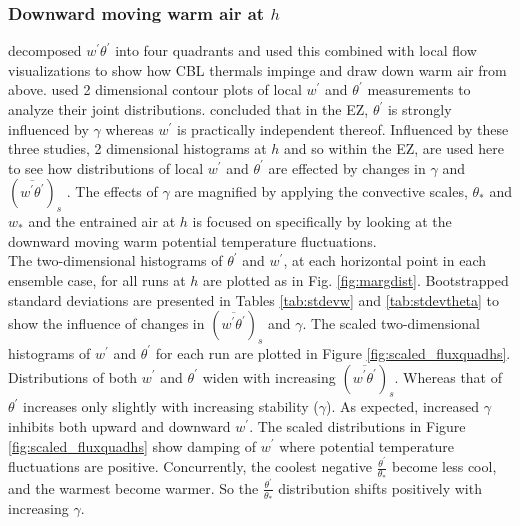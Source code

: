\subsubsection{Downward moving warm air at $h$}
\label{subsubsec:downwarm}

\cite{SullMoengStev} decomposed $w^{'}\theta^{'}$ into four quadrants and used this combined with local flow visualizations to show how CBL thermals impinge and draw down warm air from above. \cite{MahrtPaum} used 2 dimensional contour plots of local $w^{'}$ and $\theta^{'}$ measurements to analyze their joint distributions.  \cite{Sorbjan1} concluded that in the EZ, $\theta^{'}$ is strongly influenced by $\gamma$  whereas $w^{'}$ is practically independent thereof.  Influenced by these three studies, 2 dimensional histograms at $h$ and so within the EZ, are used here to see how distributions of local $w^{'}$ and $\theta^{'}$ are effected by changes in $\gamma$ and $(\overline{w^{'}\theta^{'}})_{s}$ .  The effects of $\gamma$ are magnified by applying the convective scales, $\theta_{*}$ and $w_{*}$ and the entrained air at $h$ is focused on specifically by looking at the downward moving warm potential temperature fluctuations.\\    

The two-dimensional histograms of $\theta^{'}$ and $w^{'}$, at each horizontal point in each ensemble case, for all runs at $h$ are plotted as in Fig. \ref{fig:margdist}.  Bootstrapped standard deviations are presented in Tables \ref{tab:stdevw} and \ref{tab:stdevtheta} to show the influence of changes in $(\overline{w^{'} \theta^{'}})_{s}$ and $\gamma$.  The scaled two-dimensional histograms of $w^{'}$ and $\theta^{'}$ for each run are plotted in Figure \ref{fig:scaled_fluxquadhs}.\\

Distributions of both $w^{'}$ and $\theta^{'}$ widen with increasing $(\overline{w^{'}\theta^{'}})_{s}$.  Whereas that of $\theta^{'}$ increases only slightly with increasing stability ($\gamma$).  As expected, increased $\gamma$ inhibits both upward and downward $w^{'}$. The scaled distributions in Figure \ref{fig:scaled_fluxquadhs} show damping of $w^{'}$ where potential temperature fluctuations are positive. Concurrently, the coolest negative $\frac{\theta^{'}}{\theta_{*}}$ become less cool, and the warmest become warmer.  So the $\frac{\theta^{'}}{\theta_{*}}$ distribution shifts positively with increasing $\gamma$.\\ 

